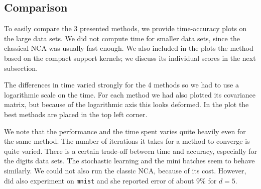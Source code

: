     \subsection{Comparison}
    \label{subsec:eval-comparison}

    To easily compare the 3 presented methods, we provide time-accuracy plots on the large data sets. We did not compute time for smaller data sets, since the classical NCA was usually fast enough. We also included in the plots the method based on the compact support kernels; we discuss its individual scores in the next subsection. 

    The differences in time varied strongly for the 4 methods so we had to use a logarithmic scale on the time. For each method we had also plotted its covariance matrix, but because of the logarithmic axis this looks deformed. In the plot the best methods are placed in the top left corner. 

    We note that the performance and the time spent varies quite heavily even for the same method. The number of iterations it takes for a method to converge is quite varied. There is a certain trade-off between time and accuracy, especially for the digits data sets. The stochastic learning and the mini batches seem to behave similarly. We could not also run the classic NCA, because of its cost. However, \citet{singh2010} did also experiment on \texttt{mnist} and she reported error of about $9\%$ for $d=5$.

